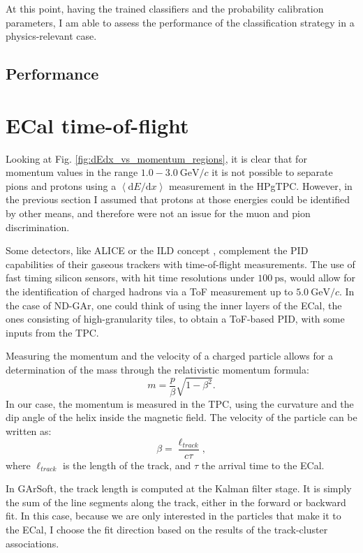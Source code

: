 At this point, having the trained classifiers and the probability calibration parameters, I am able to assess the performance of the classification strategy in a physics-relevant case.

\subsection{Performance}

\section{ECal time-of-flight}

Looking at Fig. \ref{fig:dEdx_vs_momentum_regions}, it is clear that for momentum values in the range $1.0-3.0 ~ \mathrm{GeV}/c$ it is not possible to separate pions and protons using a $\left<\mathrm{d}E/\mathrm{d}x\right>$ measurement in the HPgTPC. However, in the previous section I assumed that protons at those energies could be identified by other means, and therefore were not an issue for the muon and pion discrimination.

Some detectors, like ALICE \cite{ALICE2011} or the ILD concept \cite{Einhaus2021}, complement the PID capabilities of their gaseous trackers with time-of-flight measurements. The use of fast timing silicon sensors, with hit time resolutions under $100~\mathrm{ps}$, would allow for the identification of charged hadrons via a ToF measurement up to $5.0 ~ \mathrm{GeV}/c$. In the case of ND-GAr, one could think of using the inner layers of the ECal, the ones consisting of high-granularity tiles, to obtain a ToF-based PID, with some inputs from the TPC.

Measuring the momentum and the velocity of a charged particle allows for a determination of the mass through the relativistic momentum formula:
\begin{equation}\label{8.19}
	m = \frac{p}{\beta} \sqrt{1-\beta^{2}}.
\end{equation}
In our case, the momentum is measured in the TPC, using the curvature and the dip angle of the helix inside the magnetic field. The velocity of the particle can be written as:
\begin{equation}
	\beta = \frac{\ell_{track}}{c \tau},
\end{equation}
where $\ell_{track}$ is the length of the track, and $\tau$ the arrival time to the ECal.

In GArSoft, the track length is computed at the Kalman filter stage. It is simply the sum of the line segments along the track, either in the forward or backward fit. In this case, because we are only interested in the particles that make it to the ECal, I choose the fit direction based on the results of the track-cluster associations.


